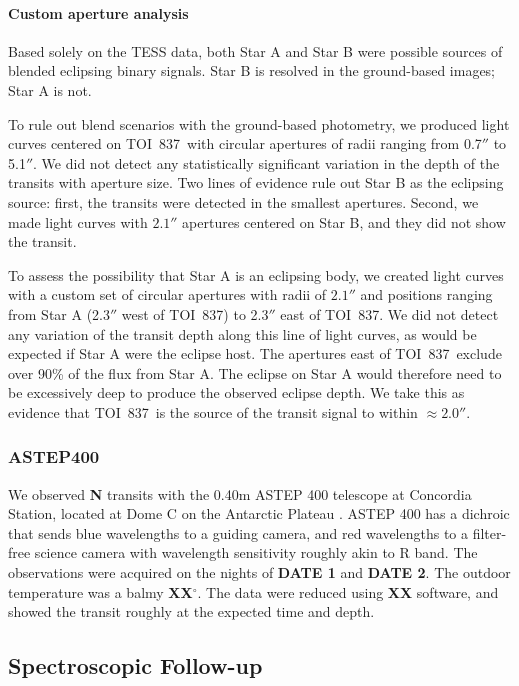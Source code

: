 \documentclass[12pt,twocolumn,tighten]{aastex63}
\newcommand{\tn}{TOI~837} %
\begin{document}
\paragraph{Custom aperture analysis}
Based solely on the TESS data, both Star A and Star B were possible
sources of blended eclipsing binary signals.  Star B is resolved in
the ground-based images; Star A is not.

To rule out blend scenarios with the ground-based photometry, we
produced light curves centered on \tn\ with circular apertures of
radii ranging from 0.7$''$ to 5.1$''$.  We did not detect any
statistically significant variation in the depth of the transits with
aperture size.  Two lines of evidence rule out Star B as the eclipsing
source: first, the transits were detected in the smallest apertures.
Second, we made light curves with $2.1''$ apertures centered on Star
B, and they did not show the transit.

To assess the possibility that Star A is an eclipsing body, we created
light curves with a custom set of circular apertures with radii of
$2.1''$ and positions ranging from Star A (2.3$''$ west of \tn) to
2.3$''$ east of \tn.  We did not detect any variation of the transit
depth along this line of light curves, as would be expected if Star A
were the eclipse host.  The apertures east of \tn\ exclude over 90\%
of the flux from Star A.  The eclipse on Star A would therefore need
to be excessively deep to produce the observed eclipse depth.  We take
this as evidence that \tn\ is the source of the transit signal to
within $\approx2.0''$.



\subsubsection{ASTEP400}

We observed {\bf N} transits with the 0.40m ASTEP 400 telescope at
Concordia Station, located at Dome C on the Antarctic Plateau
\citep{daban_astep_2010}.  ASTEP 400 has a dichroic that sends blue
wavelengths to a guiding camera, and red wavelengths to a filter-free
science camera with wavelength sensitivity roughly akin to R band.
The observations were acquired on the nights of {\bf DATE 1} and {\bf
DATE 2}.  The outdoor temperature was a balmy {\bf XX$^\circ$}.  The
data were reduced using {\bf XX} software, and showed the transit
roughly at the expected time and depth.


\subsection{Spectroscopic Follow-up}
\label{subsec:spectra}
\end{document}
